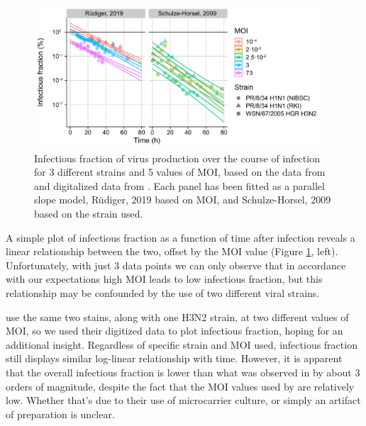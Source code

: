 \begin{figure}
\begin{center}
\includegraphics[width=0.95\textwidth, trim={0cm 0cm 0cm 0cm}, clip]{D_chapters/3_DARPinModels/InfectiousFractionAll.pdf}
\caption[Infectious fraction of virus production over the course of infection]%
{Infectious fraction of virus production over the course of infection for 3 different strains and 5 values of MOI, based on the data from \cite{frensing2016influenza, rudiger2019multiscale} and digitalized data from \cite{schulze2009infection}. Each panel has been fitted as a parallel slope model, R\"udiger, 2019 based on MOI, and Schulze-Horsel, 2009 based on the strain used.}
\label{figure:infectiousFraction}
\end{center}
\end{figure}

A simple plot of infectious fraction \cite{rudiger2019multiscale, frensing2016influenza} as a function of time after infection reveals a linear relationship between the two, offset by the MOI value (Figure \ref{figure:infectiousFraction}, left). Unfortunately, with just 3 data points we can only observe that in accordance with our expectations high MOI  leads to low infectious fraction, but this relationship may be confounded by the use of two different viral strains.

\cite{schulze2009infection} use the same two stains, along with one H3N2 strain, at two different values of MOI, so we used their digitized data to plot infectious fraction, hoping for an additional insight. Regardless of specific strain and MOI used, infectious fraction still displays similar log-linear relationship with time. However, it is apparent that the overall infectious fraction is lower than what was observed in \cite{rudiger2019multiscale, frensing2016influenza} by about 3 orders of magnitude, despite the fact that the MOI values used by \cite{schulze2009infection} are relatively low. Whether that's due to their use of microcarrier culture, or simply an artifact of preparation is unclear.

